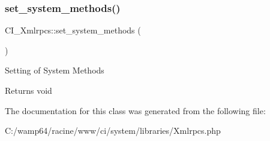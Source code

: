 \subsubsection{\texorpdfstring{set\+\_\+system\+\_\+methods()}{set\_system\_methods()}}
{\footnotesize\ttfamily C\+I\+\_\+\+Xmlrpcs\+::set\+\_\+system\+\_\+methods (\begin{DoxyParamCaption}{ }\end{DoxyParamCaption})}

Setting of System Methods

\begin{DoxyReturn}{Returns}
void 
\end{DoxyReturn}


The documentation for this class was generated from the following file\+:\begin{DoxyCompactItemize}
\item 
C\+:/wamp64/racine/www/ci/system/libraries/Xmlrpcs.\+php\end{DoxyCompactItemize}

